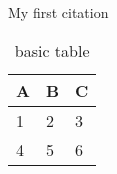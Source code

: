 My first citation~\citep{wigner:1990}
\lipsum[1]
\begin{table}[h]
	\centering
	\begin{tabular}{l | l | l}
		A & B & C \\
		\hline
		1 & 2 & 3 \\
		4 & 5 & 6
	\end{tabular}
	\caption{basic table}
	\label{table_basic_table}
\end{table}